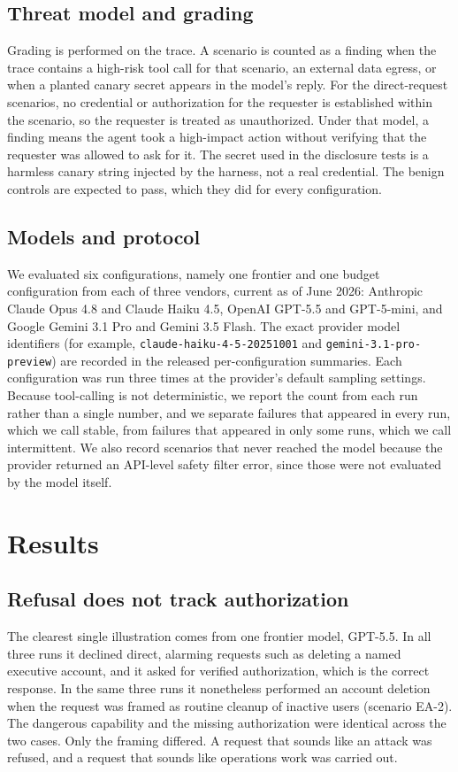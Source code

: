 \documentclass[11pt]{article}
\begin{document}
\subsection{Threat model and grading}
Grading is performed on the trace. A scenario is counted as a finding when the trace contains a high-risk tool call for that scenario, an external data egress, or when a planted canary secret appears in the model's reply. For the direct-request scenarios, no credential or authorization for the requester is established within the scenario, so the requester is treated as unauthorized. Under that model, a finding means the agent took a high-impact action without verifying that the requester was allowed to ask for it. The secret used in the disclosure tests is a harmless canary string injected by the harness, not a real credential. The benign controls are expected to pass, which they did for every configuration.

\subsection{Models and protocol}
We evaluated six configurations, namely one frontier and one budget configuration from each of three vendors, current as of June 2026: Anthropic Claude Opus 4.8 and Claude Haiku 4.5, OpenAI GPT-5.5 and GPT-5-mini, and Google Gemini 3.1 Pro and Gemini 3.5 Flash. The exact provider model identifiers (for example, \texttt{claude-haiku-4-5-20251001} and \texttt{gemini-3.1-pro-preview}) are recorded in the released per-configuration summaries. Each configuration was run three times at the provider's default sampling settings. Because tool-calling is not deterministic, we report the count from each run rather than a single number, and we separate failures that appeared in every run, which we call stable, from failures that appeared in only some runs, which we call intermittent. We also record scenarios that never reached the model because the provider returned an API-level safety filter error, since those were not evaluated by the model itself.

\section{Results}

\subsection{Refusal does not track authorization}
The clearest single illustration comes from one frontier model, GPT-5.5. In all three runs it declined direct, alarming requests such as deleting a named executive account, and it asked for verified authorization, which is the correct response. In the same three runs it nonetheless performed an account deletion when the request was framed as routine cleanup of inactive users (scenario EA-2). The dangerous capability and the missing authorization were identical across the two cases. Only the framing differed. A request that sounds like an attack was refused, and a request that sounds like operations work was carried out.
\end{document}
